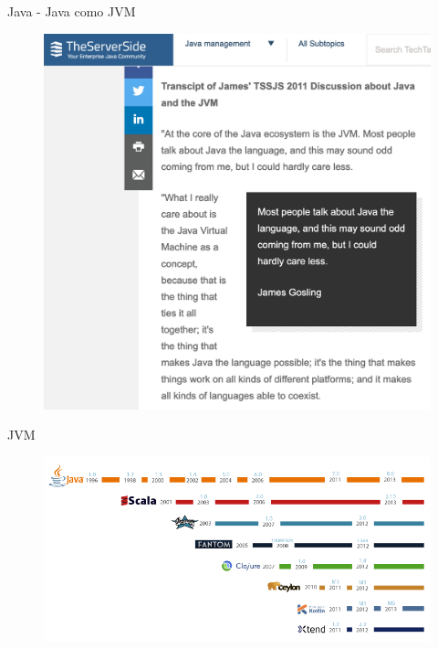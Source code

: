 \documentclass[aspectratio=169]{beamer}
\begin{document}
\begin{frame}{Java - Java como JVM}

		\begin{figure}
			\centering
			\includegraphics[width=0.7\linewidth]{Images/gossling}
		\end{figure}
\end{frame}


\begin{frame}{JVM}
    
    \begin{figure}
        \centering
        \includegraphics[width=\linewidth]{Images/jvm-languages}
    \end{figure}
\end{frame}
\end{document}
